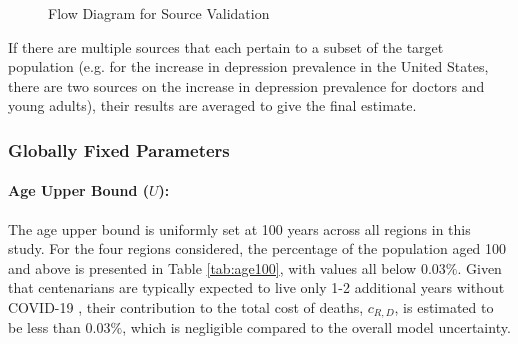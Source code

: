 \documentclass[msom,blindrev]{informs3} %
\begin{document}
\begin{APPENDICES}
\begin{figure}[htbp!]
{
}
\caption{Flow Diagram for Source Validation}
\end{figure}

If there are multiple sources that each pertain to a subset of the target population (e.g. for the increase in depression prevalence in the United States, there are two sources on the increase in depression prevalence for doctors and young adults), their results are averaged to give the final estimate.

\subsubsection{Globally Fixed Parameters}

\paragraph{Age Upper Bound ($U$):} The age upper bound is uniformly set at 100 years across all regions in this study. For the four regions considered, the percentage of the population aged 100 and above is presented in Table \ref{tab:age100}, with values all below $0.03\%$. Given that centenarians are typically expected to live only 1-2 additional years without COVID-19 , their contribution to the total cost of deaths, $c_{R,D}$, is estimated to be less than $0.03\%$, which is negligible compared to the overall model uncertainty.


\end{APPENDICES}
\end{document}
